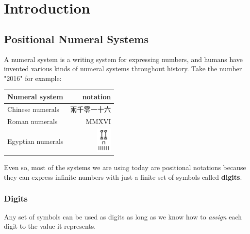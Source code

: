 \documentclass[../thesis.tex]{subfiles}
\begin{document}
\graphicspath{ {images/}{../images/} }

\chapter{Introduction}\label{introduction}

\section{Positional Numeral Systems}

A numeral system is a writing system for expressing numbers, and humans have
invented various kinds of numeral systems throughout history.
Take the number "2016" for example:

\begin{center}
    \begin{tabular}{ | l | r | }
    \textbf{Numeral system} & \textbf{notation}  \\
    \hline
    Chinese numerals    & 兩千零一十六    \\
    Roman numerals      & MMXVI         \\
    Egyptian numerals   & \includegraphics[width=2em]{egyptian/2016.png} \\
    \end{tabular}
\end{center}

Even so, most of the systems we are using today are positional notations\cite{knuth1998art}
because they can express infinite numbers with just a finite set of symbols called \textbf{digits}.

\subsection{Digits}

Any set of symbols can be used as digits as long as we know how to \textit{assign}
each digit to the value it represents.
\end{document}
